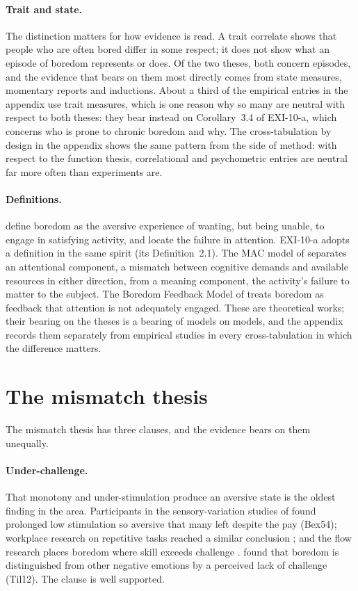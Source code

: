 \documentclass{situationist-preprint}
\begin{document}
\paragraph{Trait and state.} The distinction matters for how evidence is read. A trait correlate shows that people who are often bored differ in some respect; it does not show what an episode of boredom represents or does. Of the two theses, both concern episodes, and the evidence that bears on them most directly comes from state measures, momentary reports and inductions. About a third of the empirical entries in the appendix use trait measures, which is one reason why so many are neutral with respect to both theses: they bear instead on Corollary~3.4 of EXI-10-a, which concerns who is prone to chronic boredom and why. The cross-tabulation by design in the appendix shows the same pattern from the side of method: with respect to the function thesis, correlational and psychometric entries are neutral far more often than experiments are.

\paragraph{Definitions.} \citet{EastwoodEtAl2012} define boredom as the aversive experience of wanting, but being unable, to engage in satisfying activity, and locate the failure in attention. EXI-10-a adopts a definition in the same spirit (its Definition~2.1). The MAC model of \citet{WestgateWilson2018} separates an attentional component, a mismatch between cognitive demands and available resources in either direction, from a meaning component, the activity's failure to matter to the subject. The Boredom Feedback Model of \citet{Tam2021} treats boredom as feedback that attention is not adequately engaged. These are theoretical works; their bearing on the theses is a bearing of models on models, and the appendix records them separately from empirical studies in every cross-tabulation in which the difference matters.

\section{The mismatch thesis}\label{s:mismatch}

The mismatch thesis has three clauses, and the evidence bears on them unequally.

\paragraph{Under-challenge.} That monotony and under-stimulation produce an aversive state is the oldest finding in the area. Participants in the sensory-variation studies of \citet{Bexton1954} found prolonged low stimulation so aversive that many left despite the pay (Bex54); workplace research on repetitive tasks reached a similar conclusion \citep{OHanlon1981}; and the flow research places boredom where skill exceeds challenge \citep{Csikszentmihalyi1975,Csikszentmihalyi1990}. \citet{vanTilburgIgou2012} found that boredom is distinguished from other negative emotions by a perceived lack of challenge (Til12). The clause is well supported.
\end{document}
